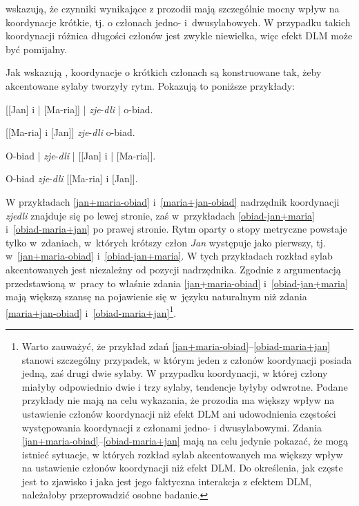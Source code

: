 \cite{wright2005ladies} wskazują, że czynniki wynikające z prozodii mają szczególnie mocny wpływ na koordynacje krótkie, tj. o członach jedno- i~dwusylabowych. W przypadku takich koordynacji różnica długości członów jest zwykle niewielka, więc efekt DLM może być pomijalny.

Jak wskazują \cite{mcdonald1993word}, koordynacje o krótkich członach są konstruowane tak, żeby akcentowane sylaby tworzyły rytm. Pokazują to poniższe przykłady:

\begin{exe}
\ex \label{jan+maria-obiad} {
        {[[Jan] i | [Ma-ria]] |  \textit{zje}-\textit{dli} | o-biad.}
        }
        
\ex \label{maria+jan-obiad} {
        {[[Ma-ria] i [Jan]] \textit{zje}-\textit{dli} o-biad.}
        }
        
\ex \label{obiad-jan+maria} {
        {O-biad | \textit{zje}-\textit{dli} | [[Jan] i | [Ma-ria]].}
        }

\ex \label{obiad-maria+jan} {
        {O-biad \textit{zje}-\textit{dli} [[Ma-ria] i [Jan]].}
        }
\end{exe}
        
W przykładach \eqref{jan+maria-obiad} i~\eqref{maria+jan-obiad} nadrzędnik koordynacji \textit{zjedli} znajduje się po lewej stronie, zaś w~przykładach \eqref{obiad-jan+maria} i~\eqref{obiad-maria+jan} po prawej stronie. Rytm oparty o stopy metryczne powstaje tylko w~zdaniach, w~których krótszy człon \textit{Jan} występuje jako pierwszy, tj. w~\eqref{jan+maria-obiad} i~\eqref{obiad-jan+maria}. W tych przykładach rozkład sylab akcentowanych jest niezależny od pozycji nadrzędnika. Zgodnie z argumentacją przedstawioną w~pracy \cite{mcdonald1993word} to właśnie zdania \eqref{jan+maria-obiad} i~\eqref{obiad-jan+maria} mają większą szansę na pojawienie się w~języku naturalnym niż zdania \eqref{maria+jan-obiad} i~\eqref{obiad-maria+jan}\footnote{
Warto zauważyć, że przykład zdań \eqref{jan+maria-obiad}--\eqref{obiad-maria+jan} stanowi szczególny przypadek, w którym jeden z członów koordynacji posiada jedną, zaś drugi dwie sylaby. W przypadku koordynacji, w której człony miałyby odpowiednio dwie i trzy sylaby, tendencje byłyby odwrotne. Podane przykłady nie mają na celu wykazania, że prozodia ma większy wpływ na ustawienie członów koordynacji niż efekt DLM ani udowodnienia częstości występowania koordynacji z członami jedno- i dwusylabowymi. Zdania \eqref{jan+maria-obiad}--\eqref{obiad-maria+jan} mają na celu jedynie pokazać, że mogą istnieć sytuacje, w których rozkład sylab akcentowanych ma większy wpływ na ustawienie członów koordynacji niż efekt DLM. Do określenia, jak częste jest to zjawisko i jaka jest jego faktyczna interakcja z efektem DLM, należałoby przeprowadzić osobne badanie.
}.

